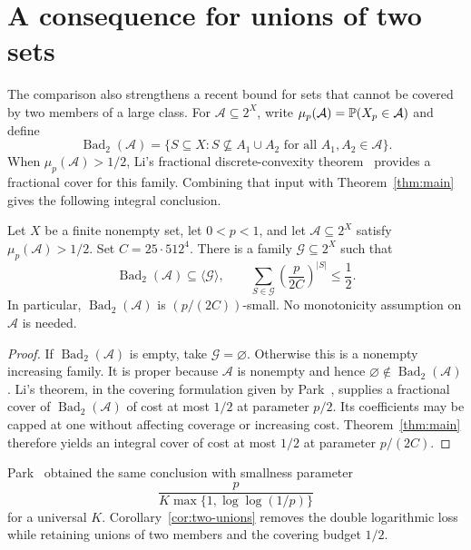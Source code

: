 \section{A consequence for unions of two sets}\label{sec:consequence}

The comparison also strengthens a recent bound for sets that cannot be
covered by two members of a large class. For $\mathcal A\subseteq2^X$,
write $\mu_p(\mathcal A)=\P(X_p\in\mathcal A)$ and define
\[
 \operatorname{Bad}_2(\mathcal A)
 =\{S\subseteq X:S\nsubseteq A_1\cup A_2
                   \text{ for all }A_1,A_2\in\mathcal A\}.
\]
When $\mu_p(\mathcal A)>1/2$, Li's fractional discrete-convexity
theorem~\cite[Corollary~3.1]{Li2026} provides a fractional cover for this
family. Combining that input with Theorem~\ref{thm:main} gives the
following integral conclusion.

\begin{corollary}\label{cor:two-unions}
Let $X$ be a finite nonempty set, let $0<p<1$, and let
$\mathcal A\subseteq2^X$ satisfy $\mu_p(\mathcal A)>1/2$.
Set $C=25\cdot512^4$. There is a family $\mathcal G\subseteq2^X$ such
that
\[
 \operatorname{Bad}_2(\mathcal A)\subseteq\langle\mathcal G\rangle,
 \qquad
 \sum_{S\in\mathcal G}\left(\frac{p}{2C}\right)^{|S|}\le\frac12.
\]
In particular, $\operatorname{Bad}_2(\mathcal A)$ is
$(p/(2C))$-small. No monotonicity assumption on $\mathcal A$ is needed.
\end{corollary}

\begin{proof}
If $\operatorname{Bad}_2(\mathcal A)$ is empty, take
$\mathcal G=\varnothing$. Otherwise this is a nonempty increasing
family. It is proper because $\mathcal A$ is nonempty and hence
$\varnothing\notin\operatorname{Bad}_2(\mathcal A)$.
Li's theorem, in the covering formulation given by
Park~\cite[Theorem~3.4]{Park2026}, supplies a fractional cover of
$\operatorname{Bad}_2(\mathcal A)$ of cost at most $1/2$ at parameter
$p/2$. Its coefficients may be capped at one without affecting coverage
or increasing cost. Theorem~\ref{thm:main} therefore yields an integral
cover of cost at most $1/2$ at parameter $p/(2C)$.
\end{proof}

Park~\cite[Corollary~3.5]{Park2026} obtained the same conclusion with
smallness parameter
\[
 \frac{p}{K\max\{1,\log\log(1/p)\}}
\]
for a universal $K$. Corollary~\ref{cor:two-unions} removes the double
logarithmic loss
while retaining unions of two members and the covering budget $1/2$.
